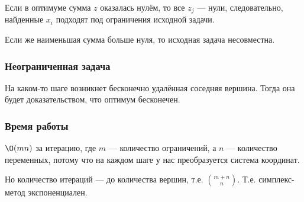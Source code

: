 Если в оптимуме сумма $z$ оказалась нулём,
то все $z_j$ --- нули, следовательно,
найденные $x_i$ подходят под ограничения исходной задачи.

Если же наименьшая сумма больше нуля,
то исходная задача несовместна.

\subsubsection{Неограниченная задача}
На каком-то шаге возникнет
бесконечно удалённая соседняя вершина.
Тогда она будет доказательством,
что оптимум бесконечен.

\subsubsection{Время работы}
$\O(mn)$ за итерацию,
где $m$ --- количество ограничений,
а $n$ --- количество переменных,
потому что на каждом шаге у нас
преобразуется система координат.

Но количество итераций
--- до количества вершин,
т.е. $\binom{m + n}{n}$.
Т.е. симплекс-метод экспоненциален.
